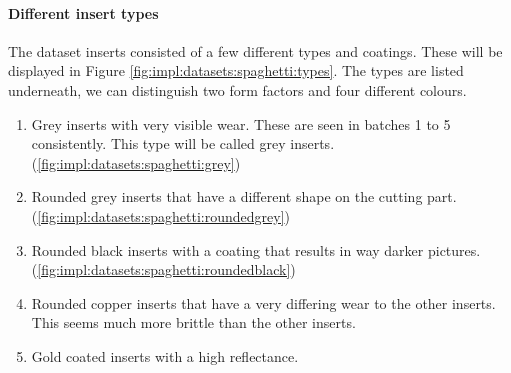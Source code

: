 \paragraph{Different insert types}
The dataset inserts consisted of a few different types and coatings. These will be displayed in Figure \ref{fig:impl:datasets:spaghetti:types}. The types are listed underneath, we can distinguish two form factors and four different colours.

\begin{enumerate}[a]
	\item Grey inserts with very visible wear. These are seen in batches 1 to 5 consistently. This type will be called grey inserts. (\ref{fig:impl:datasets:spaghetti:grey})
	\item Rounded grey inserts that have a different shape on the cutting part.  (\ref{fig:impl:datasets:spaghetti:roundedgrey})
	\item Rounded black inserts with a coating that results in way darker pictures.  (\ref{fig:impl:datasets:spaghetti:roundedblack})
	\item Rounded copper inserts that have a very differing wear to the other inserts. This seems much more brittle than the other inserts.
	\item Gold coated inserts with a high reflectance.
\end{enumerate}

